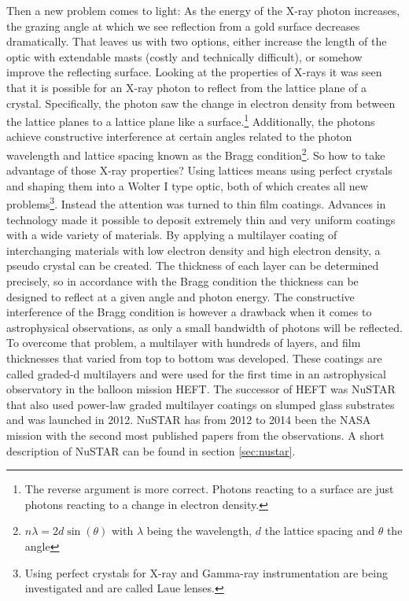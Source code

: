 Then a new problem comes to light: As the energy of the X-ray photon increases, the grazing angle at which we see reflection from a gold surface decreases dramatically. That leaves us with two options, either increase the length of the optic with extendable masts (costly and technically difficult), or somehow improve the reflecting surface. Looking at the properties of X-rays it was seen that it is possible for an X-ray photon to reflect from the lattice plane of a crystal. Specifically, the photon saw the change in electron density from between the lattice planes to a lattice plane like a surface.\footnote{The reverse argument is more correct. Photons reacting to a surface are just photons reacting to a change in electron density.} Additionally, the photons achieve constructive interference at certain angles related to the photon wavelength and lattice spacing known as the Bragg condition\footnote{$n\lambda=2d\sin(\theta)$ with $\lambda$ being the wavelength, $d$ the lattice spacing and $\theta$ the angle}. So how to take advantage of those X-ray properties? Using lattices means using perfect crystals and shaping them into a Wolter I type optic, both of which creates all new problems\footnote{Using perfect crystals for X-ray and Gamma-ray instrumentation are being investigated and are called Laue lenses\cite{Lund:1992kc,Barriere:2014dj,Barriere:2009cm}.}. Instead the attention was turned to thin film coatings. Advances in technology made it possible to deposit extremely thin and very uniform coatings with a wide variety of materials. By applying a multilayer coating of interchanging materials with low electron density and high electron density, a pseudo crystal can be created. The thickness of each layer can be determined precisely, so in accordance with the Bragg condition the thickness can be designed to reflect at a given angle and photon energy. The constructive interference of the Bragg condition is however a drawback when it comes to astrophysical observations, as only a small bandwidth of photons will be reflected. To overcome that problem, a multilayer with hundreds of layers, and film thicknesses that varied from top to bottom was developed. These coatings are called graded-d multilayers and were used for the first time in an astrophysical observatory in the balloon mission HEFT\cite{Koglin:2004tr,Madsen:2003te,Jensen:2002tf}. The successor of HEFT was NuSTAR\cite{Harrison:2013wl,Harrison:2010gu,Harrison:2005wa} that also used power-law graded multilayer coatings on slumped glass substrates\cite{Christensen:2011wg,Brejnholt2012} and was launched in 2012. NuSTAR has from 2012 to 2014 been the NASA mission with the second most published papers from the observations. A short description of NuSTAR can be found in section \ref{sec:nustar}.

